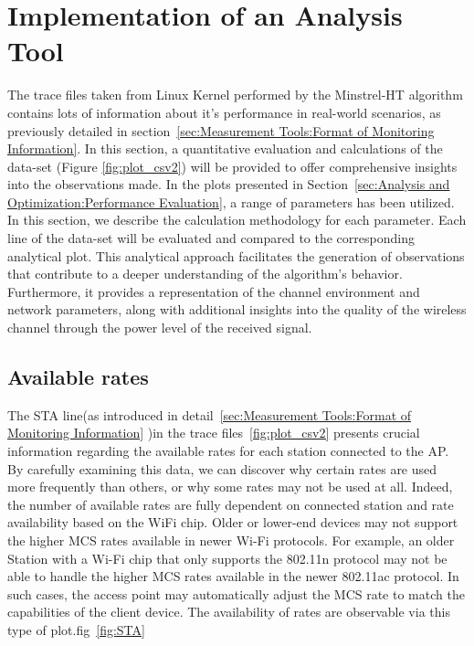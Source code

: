 \section{Implementation of an Analysis Tool}
\label{sec:Analysis and Optimization:Implementation of an Analysis Tool}
The trace files taken from Linux Kernel performed by the Minstrel-HT algorithm contains lots of information about it's performance in real-world scenarios, as previously detailed in section~\ref{sec:Measurement Tools:Format of Monitoring Information}. In this section, a quantitative evaluation and calculations of the data-set (Figure \ref{fig:plot_csv2}) will be provided to offer comprehensive insights into the observations made. 
In the plots presented in Section~\ref{sec:Analysis and Optimization:Performance Evaluation}, a range of parameters has been utilized. In this section, we describe the calculation methodology for each parameter. Each line of the data-set will be evaluated and compared to the corresponding analytical plot. This analytical approach facilitates the generation of observations that contribute to a deeper understanding of the algorithm's behavior. Furthermore, it provides a representation of the channel environment and network parameters, along with additional insights into the quality of the wireless channel through the power level of the received signal.

\newpage
\subsection{Available rates}
\label{sec:Analysis and Optimization:Implementation of an Analysis Tool:AvailableRates}

The STA line(as introduced in detail~\ref{sec:Measurement Tools:Format of Monitoring Information} )in the trace files~\ref{fig:plot_csv2} presents crucial information regarding the available rates for each station connected to the AP. By carefully examining this data, we can discover why certain rates are used more frequently than others, or why some rates may not be used at all. Indeed, the number of available rates are fully dependent on connected station and rate availability based on the WiFi chip. Older or lower-end devices may not support the higher MCS rates available in newer Wi-Fi protocols. For example, an older Station with a Wi-Fi chip that only supports the 802.11n protocol may not be able to handle the higher MCS rates available in the newer 802.11ac protocol. In such cases, the access point may automatically adjust the MCS rate to match the capabilities of the client device. The availability of rates are observable via this type of plot.fig~\ref{fig:STA}

